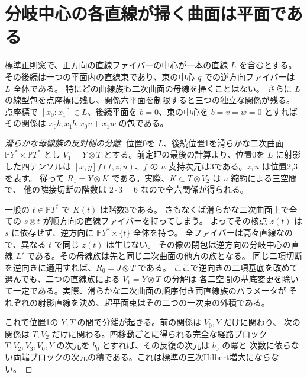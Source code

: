 \section{分岐中心の各直線が掃く曲面は平面である}
\label{sec:plane-branch-pencils}
\begin{theorem}\label{thm:plane-branch-pencils}
標準正則窓で、正方向の直線ファイバーの中心が一本の直線 $L$ を含むとする。
その後続は一つの平面内の直線束であり、束の中心 $q$ での逆方向ファイバーは $L$ 全体である。
特にどの曲線族も二次曲面の母線を掃くことはない。
さらに $L$ の線型包を点座標に残し、関係六平面を制限すると三つの独立な関係が残る。
点座標で $[x_0:x_1]\in L$、後続平面を $b=0$、束の中心を $b=v=w=0$ とすれば
その関係は $x_0b,x_1b,x_0v+x_1w$ の包である。
\end{theorem}
\begin{proof}[滑らかな母線族の反対側の分離]
位置0を $L$、後続位置1を滑らかな二次曲面 $\mathbb P Y^*\times\mathbb P T^*$ とし
$V_1=Y\otimes T$ とする。前定理の最後の計算より、位置0を $L$ に射影した四テンソルは
$[x,y]f(t,z,u)$、$f$ の $u$ 支持次元は3である。$z,u$ は位置2,3を表す。
従って $R_1=Y\otimes K$ である。実際、$K\subset T\otimes V_2$ は $u$ 縮約による三空間で、
他の隣接切断の階数は $2\cdot3=6$ なので全六関係が得られる。

一般の $t\in\mathbb P T^*$ で $K(t)$ は階数3である。
さもなくば滑らかな二次曲面上で全ての $s\otimes t$ が順方向の直線ファイバーを持ってしまう。
よってその核点 $z(t)$ は $s$ に依存せず、逆方向に $\mathbb P Y^*\times\{t\}$ 全体を持つ。
全ファイバーは高々直線なので、異なる $t$ で同じ $z(t)$ は生じない。
その像の閉包は逆方向の分岐中心の直線 $L'$ である。その母線族は先と同じ二次曲面の他方の族となる。
同じ二項切断を逆向きに適用すれば、$R_0=J\otimes T$ である。
ここで逆向きの二項基底を改めて選んでも、二つの直線族による $V_1=Y\otimes T$ の分解は
各二空間の基底変更を除いて一定である。実際、滑らかな二次曲面の順序付き両直線族のパラメータが
それぞれの射影直線を決め、超平面束はその二つの一次束の外積である。

これで位置1の $Y,T$ の間で分離が起きる。前の関係は $V_0,Y$ だけに関わり、
次の関係は $T,V_2$ だけに関わる。四移動ごとに得られる完全な経路ブロック
$T,V_2,V_3,V_0,Y$ の次元を $b_0$ とすれば、その反復の次元は $b_0$ の冪と
次数に依らない両端ブロックの次元の積である。これは標準の三次Hilbert増大にならない。
\end{proof}

